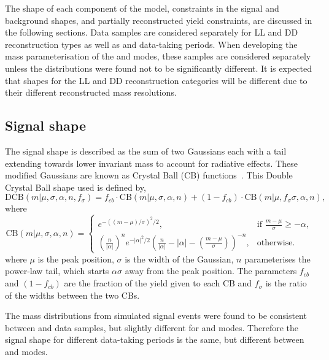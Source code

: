 The shape of each component of the model, constraints in the signal and background shapes, and partially reconstructed yield constraints, are discussed in the following sections. Data samples are considered separately for LL and DD \KS reconstruction types as well as \runone and \runtwo data-taking periods. When developing the mass parameterisation of the \kpi and \kpipipi modes, these samples are considered separately unless the distributions were found not to be significantly different. It is expected that shapes for the LL and DD \KS reconstruction categories will be different due to their different reconstructed \Bm mass resolutions.

\subsection{Signal shape}
\label{sec:massfit:signal}

The signal shape is described as the sum of two Gaussians each with a tail extending towards lower invariant mass to account for radiative effects. These modified Gaussians are known as Crystal Ball (CB) functions~\cite{Skwarnicki:1986xj}. This Double Crystal Ball shape used is defined by,
\begin{equation}
\mathrm{DCB}(m| \mu,\sigma,\alpha,n,f_{\sigma}) = f_{cb} \cdot \mathrm{CB}(m| \mu,\sigma,\alpha,n) + (1-f_{cb}) \cdot \mathrm{CB}(m|\mu,f_{\sigma}\sigma,\alpha,n),
\label{DCBshape}
\end{equation}
where
\begin{equation*}
  \mathrm{CB}(m| \mu,\sigma,\alpha,n)=
\begin{cases}
    e^{-((m-\mu)/ \sigma)^2/2},                                   & \text{if } \frac{m-\mu}{\sigma} \geq - \alpha, \\
   \left ( \frac{n}{|\alpha|} \right ) ^n e^{-|\alpha|^2/2} \left ( \frac{n}{|\alpha|} - |\alpha| - \left ( \frac{m-\mu}{\sigma} \right ) \right ) ^{-n} ,    & \text{otherwise.}
\end{cases}
\end{equation*}
where $\mu$ is the peak position, $\sigma$ is the width of the Gaussian, $n$ parameterises the power-law tail, which starts $\alpha\sigma$ away from the peak position. The parameters $f_{cb}$ and $(1-f_{cb})$ are the fraction of the yield given to each CB and $f_{\sigma}$ is the ratio of the widths between the two CBs.

The \Bm mass distributions from simulated signal events were found to be consistent between \runone and \runtwo data samples, but slightly different for \kpi and \kpipipi modes. Therefore the signal shape for different data-taking periods is the same, but different between \kpi and \kpipipi modes. 

